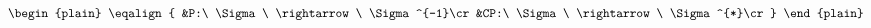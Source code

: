 \begin{equation}
\begin{plain}
\eqalign{
&P:\ \Sigma\ \rightarrow\ \Sigma^{-1}\cr
&CP:\ \Sigma\ \rightarrow\ \Sigma^{*}\cr
}
\end{plain}
\end{equation}

